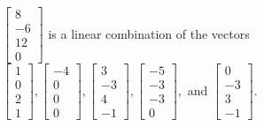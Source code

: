\begin{exercise}
\begin{exerciseStatement}
  \end{exerciseStatement}
  \begin{exerciseAnswer}
   \(\left[\begin{array}{c}
8 \\
-6 \\
12 \\
0
\end{array}\right]\) 
  	 is  
	a linear combination of the vectors \(\left[\begin{array}{c}
1 \\
0 \\
2 \\
1
\end{array}\right] , \left[\begin{array}{c}
-4 \\
0 \\
0 \\
0
\end{array}\right] , \left[\begin{array}{c}
3 \\
-3 \\
4 \\
-1
\end{array}\right] , \left[\begin{array}{c}
-5 \\
-3 \\
-3 \\
0
\end{array}\right] , \text{ and } \left[\begin{array}{c}
0 \\
-3 \\
3 \\
-1
\end{array}\right]\).

	
  


  \end{exerciseAnswer}
\end{exercise}